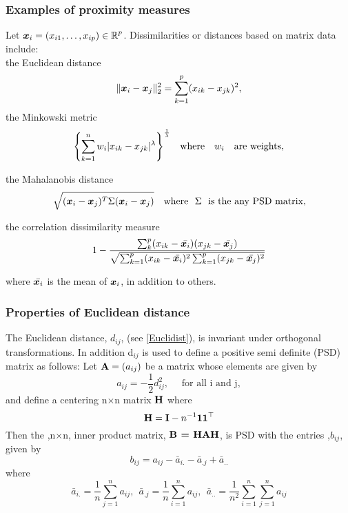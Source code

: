 \subsubsection{Examples of proximity measures}
Let $\boldsymbol{x}_{i} = (x_{i1}, \ldots, x_{ip} ) \in \operatorname{\mathbb{R}}^{p}$. Dissimilarities or distances based on matrix data include:\\
 the Euclidean distance
\begin{equation}\label{Euclidist}
\displaystyle{ \lVert\boldsymbol{x}_{i} - \boldsymbol{x}_{j}\rVert^{2}_{2} = \sum_{k=1}^{p} (x_{ik} - x_{jk})^{2}  },
\end{equation}
the Minkowski metric 
\begin{equation}\label{Minkowski}
\displaystyle{ \left \{\sum_{k=1}^{n} w_{i} \lvert x_{ik} - x_{jk} \rvert^{\lambda} 
\right \}^{\frac{1}{\lambda}} } \quad \text{where} \quad w_{i} \quad \text{are weights},
\end{equation}

the Mahalanobis distance 
\begin{equation}\label{Mahalanobis}
\displaystyle{ \sqrt{ (\vect{x}_{i} - \vect{x}_{j})^{T} \Sigma (\vect{x}_{i} - \vect{x}_{j})} } \quad \text{where} \ \  \Sigma \ \ \text{is the any PSD matrix},
\end{equation}

the correlation dissimilarity measure
\begin{equation}\label{correlationdist}
\displaystyle{  1 - \dfrac{ \sum_{k}^{p} (x_{ik} - \bar{\boldsymbol{x}_{i}})
 (x_{jk} - \bar{\boldsymbol{x}_{j}} )} 
 { \sqrt{ \sum_{k=1}^{p}  (x_{ik} - \bar{\boldsymbol{x}_{i}})^{2} 
 \sum_{k=1}^{p} (x_{jk} -   \bar{\boldsymbol{x}_{j}})^{2}    } } } 
\end{equation}

where  $\bar{\boldsymbol{x}_{i}}$ is the mean of $\boldsymbol{x}_{i}$, in addition to others.

\subsubsection{Properties of Euclidean distance}
The Euclidean distance, $d_{ij}$, (see \eqref{Euclidist}), is invariant under orthogonal transformations. In addition d$_{ij}$ is used to define a positive semi definite (PSD) matrix as follows: Let $\textbf{A} = (a_{ij})$ be a matrix whose elements are given by 
\begin{equation}\label{afromEuclidist}
a_{ij} = -\frac{1}{2}d_{ij}^{2},\quad \text{ for all i and j},
\end{equation}
 and define a centering n$\times$n matrix $\textbf{H}$ where
\begin{equation}\label{centerMatrix}
\textbf{H} = \textbf{I} - n^{-1}\textbf{1}\textbf{1}^{\top}
\end{equation}
Then the ,n$\times$n,  inner product matrix, $\textbf{B = HAH}$, is PSD
with the entries ,$b_{ij}$, given by 
\[ 
b_{ij} = a_{ij} - \bar{a}_{i.} - \bar{a}_{.j} + \bar{a}_{..}
\]
where
\begin{equation}\label{Euclidtransform}
\bar{a}_{i.} = \displaystyle \frac{1}{n}  \sum_{j = 1}^{n} a_{ij}, \ \
\bar{a}_{.j} = \displaystyle \frac{1}{n}    \sum_{i = 1}^{n} a_{ij}, \ \ 
\bar{a}_{..} = \displaystyle \frac{1}{n^2}  \sum_{i=1}^{n} \sum_{j = 1}^{n} a_{ij}  
\end{equation}


